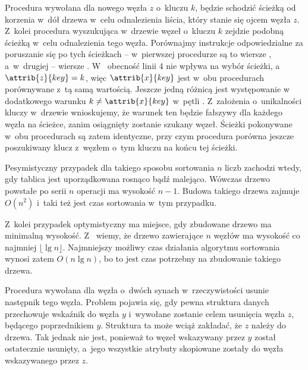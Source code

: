 \exercise %
Procedura  wywołana dla nowego węzła $z$ o~kluczu $k$, będzie schodzić ścieżką od korzenia w~dół drzewa w~celu odnalezienia liścia, który stanie się ojcem węzła $z$.
Z~kolei procedura  wyszukująca w~drzewie węzeł o~kluczu $k$ zejdzie podobną ścieżką w~celu odnalezienia tego węzła.
Porównajmy instrukcje odpowiedzialne za poruszanie się po tych ścieżkach -- w~pierwszej procedurze są to wiersze , a~w~drugiej -- wiersze .
W~ obecność linii 4 nie wpływa na wybór ścieżki, a~$\attrib{z}{key}=k$, więc $\attrib{x}{key}$ jest w~obu procedurach porównywane z~tą samą wartością.
Jeszcze jedną różnicą jest występowanie w~ dodatkowego warunku $k\ne\attrib{x}{key}$ w~pętli .
Z~założenia o~unikalności kluczy w~drzewie wnioskujemy, że warunek ten będzie fałszywy dla każdego węzła na ścieżce, zanim osiągnięty zostanie szukany węzeł.
Ścieżki pokonywane w~obu procedurach są zatem identyczne, przy czym procedura  porówna jeszcze poszukiwany klucz z~węzłem o~tym kluczu na końcu tej ścieżki.

\exercise %
Pesymistyczny przypadek dla takiego sposobu sortowania $n$ liczb zachodzi wtedy, gdy tablica jest uporządkowana rosnąco bądź malejąco.
Wówczas drzewo powstałe po serii $n$ operacji  ma wysokość $n-1$.
Budowa takiego drzewa zajmuje $O(n^2)$ i~taki też jest czas sortowania w~tym przypadku.

Z~kolei przypadek optymistyczny ma miejsce, gdy zbudowane drzewo ma minimalną wysokość.
Z~ wiemy, że drzewo zawierające $n$ węzłów ma wysokość co najmniej $\lfloor\lg n\rfloor$.
Najmniejszy możliwy czas działania algorytmu sortowania wynosi zatem $O(n\lg n)$, bo to jest czas potrzebny na zbudowanie takiego drzewa.

\exercise %
Procedura  wywołana dla węzła o~dwóch synach w~rzeczywistości usunie następnik tego węzła.
Problem pojawia się, gdy pewna struktura danych przechowuje wskaźnik do węzła $y$ i~wywołane zostanie  celem usunięcia węzła $z$, będącego poprzednikiem $y$.
Struktura ta może wciąż zakładać, że $z$ należy do drzewa.
Tak jednak nie jest, ponieważ to węzeł wskazywany przez $y$ został ostatecznie usunięty, a~jego wszystkie atrybuty skopiowane zostały do węzła wskazywanego przez $z$.

